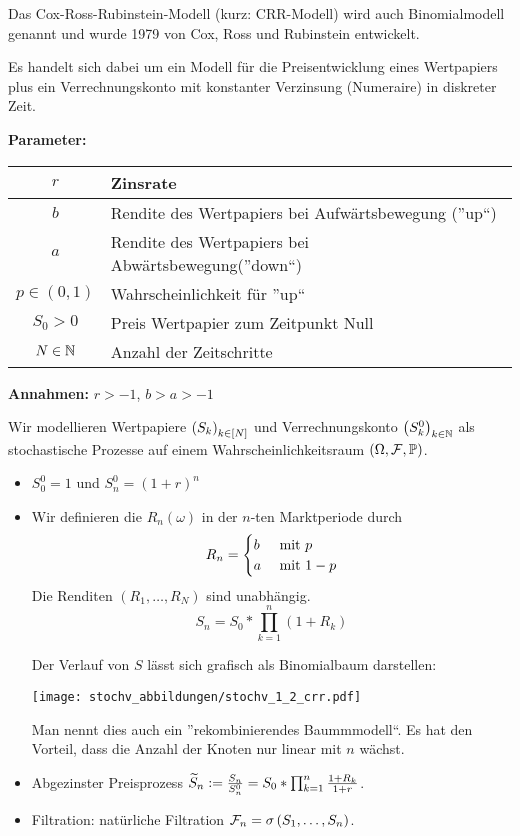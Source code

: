 Das Cox-Ross-Rubinstein-Modell (kurz: CRR-Modell) wird auch Binomialmodell genannt und wurde 1979 von Cox, Ross und Rubinstein entwickelt.

Es handelt sich dabei um ein Modell für die Preisentwicklung eines Wertpapiers plus ein Verrechnungskonto mit konstanter Verzinsung (Numeraire) in diskreter Zeit.

\textbf{Parameter:}

\begin{center}
	\begin{tabular}{|c|l|}
		\hline
		$r$ & Zinsrate \\ \hline
		$b$ & Rendite des Wertpapiers bei Aufwärtsbewegung (''up``) \\ \hline
		$a$ & Rendite des Wertpapiers bei Abwärtsbewegung(''down``) \\ \hline
		$p \in (0,1)$ & Wahrscheinlichkeit für ''up`` \\ \hline
		$S_0 > 0$ & Preis Wertpapier zum Zeitpunkt Null \\ \hline
		$N \in \N$ & Anzahl der Zeitschritte \\ \hline
	\end{tabular}
\end{center}

\textbf{Annahmen:} $r > -1$, $b > a > -1$

Wir modellieren Wertpapiere $\folge{S_k}{k \in [N]}$ und Verrechnungskonto $\folge{S_k^0}{k \in \N}$ als stochastische Prozesse auf einem Wahrscheinlichkeitsraum $(\Omega, \F, \P)$.

\begin{itemize}
	\item $S_0^0 = 1$ und $S_n^0 = (1+r)^n$
	\item Wir definieren die  $R_n(\omega)$ in der $n$-ten Marktperiode durch
	\begin{equation*}
		R_n = \begin{cases} b & \mit p \\ a & \mit 1-p \end{cases}
	\end{equation*}
	Die Renditen $(R_1, \dots, R_N)$ sind unabhängig.
	\begin{equation*}
		S_n = S_0 * \prod_{k=1}^n (1+R_k)
	\end{equation*}
	
	Der Verlauf von $S$ lässt sich grafisch als Binomialbaum darstellen:
	
	\begin{center}
		\texttt{[image: stochv\_abbildungen/stochv\_1\_2\_crr.pdf]}
	\end{center}
	
	Man nennt dies auch ein ''rekombinierendes Baummmodell``. Es hat den Vorteil, dass die Anzahl der Knoten nur linear mit $n$ wächst.
	
	\item Abgezinster Preisprozess $\schlange{S}_n \defeq \frac{S_n}{S_n^0} = S_0 * \prod_{k=1}^n \frac{1+R_k}{1+r}$.
	
	\item Filtration: natürliche Filtration $\F_n = \sigma \brackets{S_1, \dots, S_n}$.
\end{itemize}

